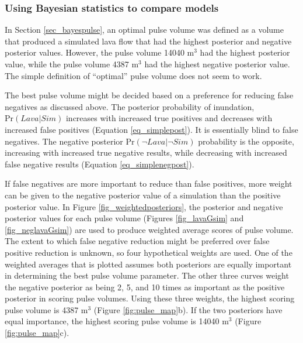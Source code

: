 		\subsubsection{Using Bayesian statistics to compare models}
		In Section \ref{sec_bayespulse}, an optimal pulse volume was defined as a volume that produced a simulated lava flow that had the highest posterior and negative posterior values. However, the pulse volume 14040 m$^3$ had the highest posterior value, while the pulse volume 4387 m$^3$ had the highest negative posterior value. The simple definition of ``optimal'' pulse volume does not seem to work.
		
		The best pulse volume might be decided based on a preference for reducing false negatives as discussed above. The posterior probability of inundation, $\text{Pr}(Lava|Sim)$ increases with increased true positives and decreases with increased false positives (Equation \ref{eq_simplepost}). It is essentially blind to false negatives. The negative posterior $\text{Pr}(\neg Lava|\neg Sim)$ probability is the opposite, increasing with increased true negative results, while decreasing with increased false negative results (Equation \ref{eq_simplenegpost}). 
		
		If false negatives are more important to reduce than false positives, more weight can be given to the negative posterior value of a simulation than the positive posterior value. In Figure \ref{fig_weightedposteriors}, the posterior and negative posterior values for each pulse volume (Figures \ref{fig_lavaGsim} and \ref{fig_neglavaGsim}) are used to produce weighted average scores of pulse volume. The extent to which false negative reduction might be preferred over false positive reduction is unknown, so four hypothetical weights are used. One of the weighted averages that is plotted assumes both posteriors are equally important in determining the best pulse volume parameter. The other three curves weight the negative posterior as being 2, 5, and 10 times as important as the positive posterior in scoring pulse volumes. Using these three weights, the highest scoring pulse volume is 4387 m$^3$ (Figure \ref{fig:pulse_map}b). If the two posteriors have equal importance, the highest scoring pulse volume is 14040 m$^3$ (Figure \ref{fig:pulse_map}c).
		
